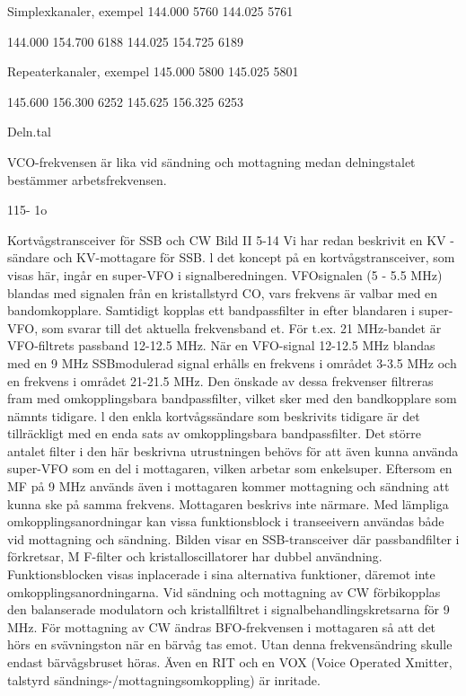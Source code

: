 Simplexkanaler,
exempel
144.000 5760
144.025 5761

144.000 154.700 6188
144.025 154.725 6189

Repeaterkanaler,
exempel
145.000 5800
145.025 5801

145.600 156.300 6252
145.625 156.325 6253

Deln.tal

VCO-frekvensen är lika vid sändning och
mottagning medan delningstalet bestämmer
arbetsfrekvensen.

115- 1o

Kortvågstransceiver för SSB och CW
Bild II 5-14
Vi har redan beskrivit en KV -sändare och
KV-mottagare för SSB. l det koncept på en
kortvågstransceiver, som visas här, ingår
en super-VFO i signalberedningen. VFOsignalen (5 - 5.5 MHz) blandas med signalen från en kristallstyrd CO, vars frekvens är
valbar med en bandomkopplare. Samtidigt
kopplas ett bandpassfilter in efter blandaren
i super-VFO, som svarar till det aktuella
frekvensband et.
För t.ex. 21 MHz-bandet är VFO-filtrets
passband 12-12.5 MHz. När en VFO-signal
12-12.5 MHz blandas med en 9 MHz SSBmodulerad signal erhålls en frekvens i området 3-3.5 MHz och en frekvens i området
21-21.5 MHz. Den önskade av dessa frekvenser filtreras fram med omkopplingsbara
bandpassfilter, vilket sker med den bandkopplare som nämnts tidigare.
l den enkla kortvågssändare som beskrivits tidigare är det tillräckligt med en enda
sats av omkopplingsbara bandpassfilter. Det
större antalet filter i den här beskrivna utrustningen behövs för att även kunna använda super-VFO som en del i mottagaren,
vilken arbetar som enkelsuper. Eftersom en
MF på 9 MHz används även i mottagaren
kommer mottagning och sändning att kunna
ske på samma frekvens.
Mottagaren beskrivs inte närmare. Med
lämpliga omkopplingsanordningar kan vissa funktionsblock i transeeivern användas
både vid mottagning och sändning. Bilden
visar en SSB-transceiver där passbandfilter
i förkretsar, M F-filter och kristalloscillatorer
har dubbel användning. Funktionsblocken
visas inplacerade i sina alternativa funktioner, däremot inte omkopplingsanordningarna.
Vid sändning och mottagning av CW
förbikopplas den balanserade modulatorn
och kristallfiltret i signalbehandlingskretsarna för 9 MHz. För mottagning av CW ändras
BFO-frekvensen i mottagaren så att det
hörs en svävningston när en bärvåg tas
emot. Utan denna frekvensändring skulle
endast bärvågsbruset höras.
Även en RIT och en VOX (Voice Operated Xmitter, talstyrd sändnings-/mottagningsomkoppling) är inritade.

